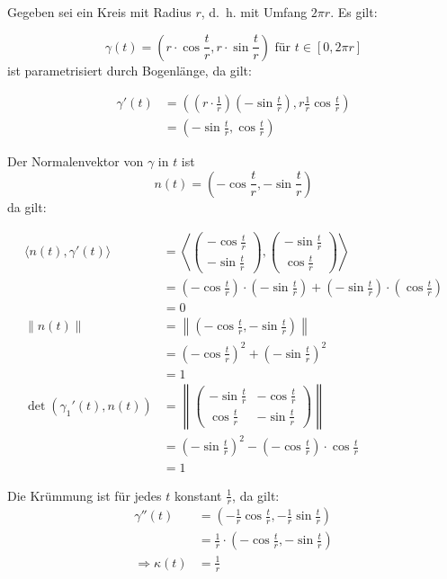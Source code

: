 \begin{beispiel}%
    Gegeben sei ein Kreis mit Radius $r$, d.~h. mit Umfang $2\pi r$.
    Es gilt:

    \[\gamma(t) = \left (r \cdot \cos \frac{t}{r}, r \cdot \sin \frac{t}{r} \right ) \text{ für } t \in [0, 2\pi r]\]
    ist parametrisiert durch Bogenlänge, da gilt:

    \begin{align*}
        \gamma'(t)  &= \left ((r \cdot \frac{1}{r}) (- \sin \frac{t}{r}), r \frac{1}{r} \cos \frac{t}{r} \right )\\
                    &= \left (- \sin \frac{t}{r}, \cos \frac{t}{r} \right )
    \end{align*}

    Der Normalenvektor von $\gamma$ in $t$ ist
    \[n(t) = \left (- \cos \frac{t}{r}, - \sin \frac{t}{r} \right )\]
    da gilt:

    \begin{align*}
        \langle n(t), \gamma'(t) \rangle &= 
        \left \langle 
            \begin{pmatrix}- \cos \frac{t}{r}\\ - \sin \frac{t}{r}\end{pmatrix},
            \begin{pmatrix}- \sin \frac{t}{r}\\ \cos \frac{t}{r}\end{pmatrix}
        \right \rangle\\
        &= (- \cos \frac{t}{r}) \cdot (- \sin \frac{t}{r}) + (- \sin \frac{t}{r}) \cdot (\cos \frac{t}{r})\\
        &= 0\\
        \|n(t)\| &= \left \| (- \cos \frac{t}{r}, - \sin \frac{t}{r}) \right \|\\
        &=(- \cos \frac{t}{r})^2 + (- \sin \frac{t}{r})^2\\
        &= 1\\
        \det(\gamma_1'(t), n(t)) &= \left \|
            \begin{pmatrix}
                - \sin \frac{t}{r} & - \cos \frac{t}{r}\\
                  \cos \frac{t}{r} & - \sin \frac{t}{r}
            \end{pmatrix}
        \right \|\\
        &= (- \sin \frac{t}{r})^2 - (- \cos \frac{t}{r}) \cdot \cos \frac{t}{r}\\
        &= 1
    \end{align*}

    Die Krümmung ist für jedes $t$ konstant $\frac{1}{r}$, da gilt:
    \begin{align*}
        \gamma''(t) &= \left (- \frac{1}{r} \cos \frac{t}{r}, - \frac{1}{r} \sin \frac{t}{r} \right )\\
                    &= \frac{1}{r} \cdot \left (- \cos \frac{t}{r}, - \sin \frac{t}{r} \right )\\
        \Rightarrow \kappa(t) &= \frac{1}{r}
    \end{align*}
\end{beispiel}

